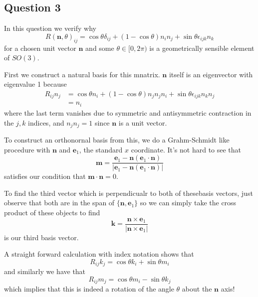 \subsection{Question 3}
In this question we verify why
\[ 
R(\mathbf{n}, \theta)_{ij} = \cos \theta \delta_{ij} + (  1 - \cos \theta )n_i n_j  + \sin \theta \epsilon_{ijk} n_k
\] 
for a chosen unit vector $\mathbf{n}$ and some $\theta \in [0, 2\pi)$ is a geometrically sensible element of $SO(3)$. 

First we construct a natural basis for this mnatrix. $\mathbf{n}$ itself is an eigenvector with eigenvalue 1 because 
\begin{align*}
R_{ij}n_j  &= \cos \theta n_i + (1 - \cos\theta )n_j n_j n_i + \sin\theta \epsilon_{ijk} n_k n_j\\ 
&= n_i 
\end{align*}
where the last term vanishes due to symmetric and antisymmetric contraction in the $j, k$ indices, and $n_j n_j  = 1$ since $\mathbf{n}$ is a unit vector. 

To construct an orthonornal basis from this, we do a Grahm-Schmidt like procedure with $\mathbf{n}$ and $\mathbf{e}_1$, the standard $x$ coordinate. It's not hard to see that 
\[
\mathbf{m} = \frac{\mathbf{e}_1 - \mathbf{n}( \mathbf{e}_1 \cdot \mathbf{n})}{|\mathbf{e}_1 - \mathbf{n} (\mathbf{e}_1 \cdot \mathbf{n}) |} 
\]
satisfies our condition that $\mathbf{m} \cdot \mathbf{n} = 0$.

To find the third vector which is perpendicualr to both of thesebasis vectors, just observe that both are in the span of $\{ \mathbf{n}, \mathbf{e}_1 \} $ so we can simply take the cross product of these objects to find 
\[ 
\mathbf{k} = \frac{\mathbf{n} \times \mathbf{e}_1 }{|\mathbf{n} \times \mathbf{e}_1|}
\]  is our third basis vector. 

A straight forward calculation with index notation shows that \[ 
R_{ij} k_j = \cos\theta k_i + \sin \theta m_i
\] and similarly we have that 
\[ 
R_{ij} m_j = \cos\theta m_i - \sin \theta k_j 
\]
which implies that this is indeed a rotation of the angle $\theta$ about the $\mathbf{n}$ axis!


\pagebreak 
